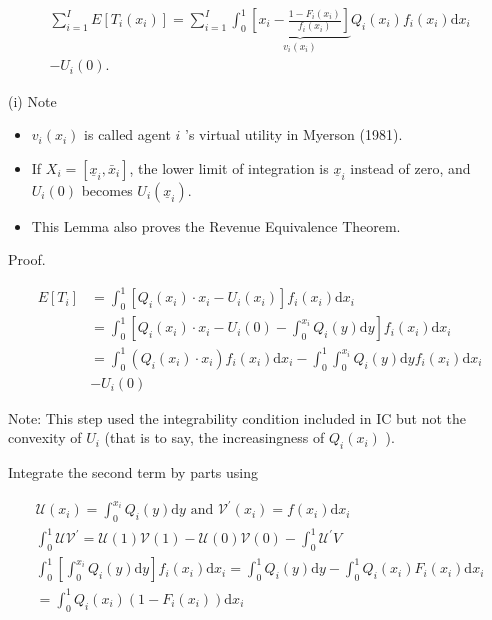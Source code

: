 \documentclass[10pt]{article}
\begin{document}
$$
\begin{array}{r}
\sum_{i=1}^{I} E\left[T_{i}\left(x_{i}\right)\right]=\sum_{i=1}^{I} \int_{0}^{1} \underbrace{\left[x_{i}-\frac{1-F_{i}\left(x_{i}\right)}{f_{i}\left(x_{i}\right)}\right]}_{v_{i}\left(x_{i}\right)} Q_{i}\left(x_{i}\right) f_{i}\left(x_{i}\right) \mathrm{d} x_{i} \\
-U_{i}(0) .
\end{array}
$$

(i) Note

\begin{itemize}
  \item $v_{i}\left(x_{i}\right)$ is called agent $i$ 's virtual utility in Myerson (1981).
  \item If $X_{i}=\left[\underline{x}_{i}, \bar{x}_{i}\right]$, the lower limit of integration is $\underline{x}_{i}$ instead of zero, and $U_{i}(0)$ becomes $U_{i}\left(\underline{x}_{i}\right)$.
  \item This Lemma also proves the Revenue Equivalence Theorem.
\end{itemize}

Proof.

$$
\begin{aligned}
E\left[T_{i}\right] & =\int_{0}^{1}\left[Q_{i}\left(x_{i}\right) \cdot x_{i}-U_{i}\left(x_{i}\right)\right] f_{i}\left(x_{i}\right) \mathrm{d} x_{i} \\
& =\int_{0}^{1}\left[Q_{i}\left(x_{i}\right) \cdot x_{i}-U_{i}(0)-\int_{0}^{x_{i}} Q_{i}(y) \mathrm{d} y\right] f_{i}\left(x_{i}\right) \mathrm{d} x_{i} \\
& =\int_{0}^{1}\left(Q_{i}\left(x_{i}\right) \cdot x_{i}\right) f_{i}\left(x_{i}\right) \mathrm{d} x_{i}-\int_{0}^{1} \int_{0}^{x_{i}} Q_{i}(y) \mathrm{d} y f_{i}\left(x_{i}\right) \mathrm{d} x_{i} \\
& -U_{i}(0)
\end{aligned}
$$

Note: This step used the integrability condition included in IC but not the convexity of $U_{i}$ (that is to say, the increasingness of $Q_{i}\left(x_{i}\right)$ ).

Integrate the second term by parts using

$$
\begin{gathered}
\mathcal{U}\left(x_{i}\right)=\int_{0}^{x_{i}} Q_{i}(y) \mathrm{d} y \text { and } \mathcal{V}^{\prime}\left(x_{i}\right)=f\left(x_{i}\right) \mathrm{d} x_{i} \\
\int_{0}^{1} \mathcal{U} \mathcal{V}^{\prime}=\mathcal{U}(1) \mathcal{V}(1)-\mathcal{U}(0) \mathcal{V}(0)-\int_{0}^{1} \mathcal{U}^{\prime} V \\
\int_{0}^{1}\left[\int_{0}^{x_{i}} Q_{i}(y) \mathrm{d} y\right] f_{i}\left(x_{i}\right) \mathrm{d} x_{i}=\int_{0}^{1} Q_{i}(y) \mathrm{d} y-\int_{0}^{1} Q_{i}\left(x_{i}\right) F_{i}\left(x_{i}\right) \mathrm{d} x_{i} \\
=\int_{0}^{1} Q_{i}\left(x_{i}\right)\left(1-F_{i}\left(x_{i}\right)\right) \mathrm{d} x_{i}
\end{gathered}
$$
\end{document}
